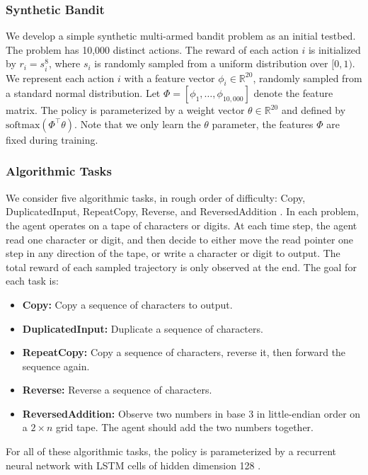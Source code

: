 \documentclass{article}
\begin{document}
\subsubsection{Synthetic Bandit}

We develop a simple synthetic multi-armed bandit problem as an initial testbed. The problem has 10,000 distinct actions. The reward of each action $i$ is initialized by $r_i = s_i^{8}$, where $s_i$ is randomly sampled from a uniform distribution over $[0,1)$. We represent each action $i$ with a feature vector $\phi_i\in \mathbb{R}^{20}$, randomly sampled from a standard normal distribution. Let $\Phi=[\phi_1,\dots,\phi_{10,000}]$ denote the feature matrix. The policy is parameterized by a weight vector $\theta\in  \mathbb{R}^{20}$ and  defined by $\text{softmax}(\Phi^{\top}\theta)$. Note that we only learn the $\theta$ parameter, the features $\Phi$ are fixed during training. 

\subsubsection{Algorithmic Tasks}

We consider five algorithmic tasks, in rough order of difficulty: Copy, DuplicatedInput, RepeatCopy, Reverse, and ReversedAddition \cite{1606.01540}. In each problem, the agent operates on a tape of characters or digits. At each time step, the agent read one character or digit, and then decide to either move the read pointer one step in any direction of the tape, or write a character or digit to output. The total reward of each sampled trajectory is only observed at the end. The goal for each task is:
\begin{itemize}
\item \textbf{Copy:} Copy a sequence of characters to output. 
\item \textbf{DuplicatedInput:} Duplicate a sequence of characters.
\item \textbf{RepeatCopy:} Copy a sequence of characters, reverse it, then forward the sequence again. 
\item \textbf{Reverse:} Reverse a sequence of characters.
\item \textbf{ReversedAddition:} Observe two numbers in base 3 in little-endian order on a $2\times n$ grid tape. The agent should add the two numbers together. 
\end{itemize}
For all of these algorithmic tasks, the policy is parameterized by a recurrent neural network with LSTM cells of hidden dimension 128 \cite{hochreiter1997long}. 
\end{document}
